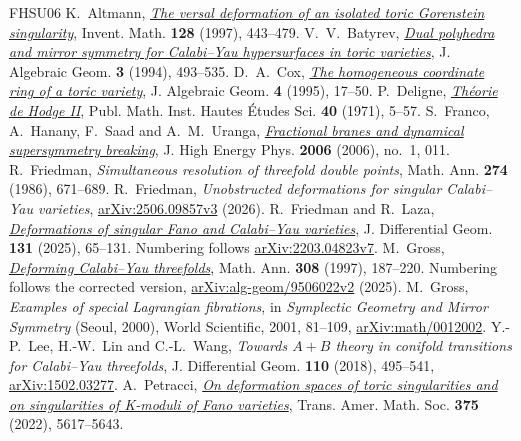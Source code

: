 \begin{thebibliography}{FHSU06}
 K.~Altmann, \href{https://doi.org/10.1007/s002220050148}{\emph{The versal deformation of an isolated toric Gorenstein singularity}}, Invent. Math. \textbf{128} (1997), 443--479.
 V.~V.~Batyrev, \href{https://arxiv.org/abs/alg-geom/9310003}{\emph{Dual polyhedra and mirror symmetry for Calabi--Yau hypersurfaces in toric varieties}}, J. Algebraic Geom. \textbf{3} (1994), 493--535.
 D.~A.~Cox, \href{https://arxiv.org/abs/alg-geom/9210008}{\emph{The homogeneous coordinate ring of a toric variety}}, J. Algebraic Geom. \textbf{4} (1995), 17--50.
 P.~Deligne, \href{https://doi.org/10.1007/BF02684692}{\emph{Th\'eorie de Hodge II}}, Publ. Math. Inst. Hautes \'Etudes Sci. \textbf{40} (1971), 5--57.
 S.~Franco, A.~Hanany, F.~Saad and A.~M.~Uranga, \href{https://doi.org/10.1088/1126-6708/2006/01/011}{\emph{Fractional branes and dynamical supersymmetry breaking}}, J. High Energy Phys. \textbf{2006} (2006), no.~1, 011.
 R.~Friedman, \emph{Simultaneous resolution of threefold double points}, Math. Ann. \textbf{274} (1986), 671--689.
 R.~Friedman, \emph{Unobstructed deformations for singular Calabi--Yau varieties}, \href{https://arxiv.org/abs/2506.09857v3}{arXiv:2506.09857v3} (2026).
 R.~Friedman and R.~Laza, \href{https://doi.org/10.4310/jdg/1755542830}{\emph{Deformations of singular Fano and Calabi--Yau varieties}}, J. Differential Geom. \textbf{131} (2025), 65--131. Numbering follows \href{https://arxiv.org/abs/2203.04823v7}{arXiv:2203.04823v7}.
 M.~Gross, \href{https://doi.org/10.1007/s002080050072}{\emph{Deforming Calabi--Yau threefolds}}, Math. Ann. \textbf{308} (1997), 187--220. Numbering follows the corrected version, \href{https://arxiv.org/abs/alg-geom/9506022v2}{arXiv:alg-geom/9506022v2} (2025).
 M.~Gross, \emph{Examples of special Lagrangian fibrations}, in \emph{Symplectic Geometry and Mirror Symmetry} (Seoul, 2000), World Scientific, 2001, 81--109, \href{https://arxiv.org/abs/math/0012002}{arXiv:math/0012002}.
 Y.-P.~Lee, H.-W.~Lin and C.-L.~Wang, \emph{Towards $A+B$ theory in conifold transitions for Calabi--Yau threefolds}, J. Differential Geom. \textbf{110} (2018), 495--541, \href{https://arxiv.org/abs/1502.03277}{arXiv:1502.03277}.
 A.~Petracci, \href{https://doi.org/10.1090/tran/8636}{\emph{On deformation spaces of toric singularities and on singularities of K-moduli of Fano varieties}}, Trans. Amer. Math. Soc. \textbf{375} (2022), 5617--5643.

\end{thebibliography}
